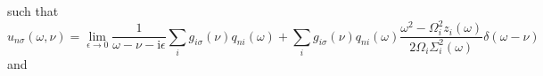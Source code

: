 such that
\begin{equation}
u_{n\sigma}(\omega,\nu) = \lim_{\epsilon\to0}\frac{1}{\omega - \nu  - \mathrm{i}\epsilon}\sum_ig_{i\sigma}(\nu)q_{ni}(\omega) + \sum_ig_{i\sigma}(\nu)q_{ni}(\omega)\frac{\omega^2 - \Omega_i^2z_i(\omega)}{2\Omega_i\Sigma_i^2(\omega)}\delta(\omega - \nu )
\end{equation}
and
\begin{equation}
\begin{split}

\end{split}
\end{equation}
